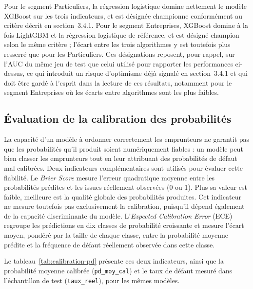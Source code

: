 Pour le segment Particuliers, la régression logistique domine nettement le modèle XGBoost sur les trois indicateurs, et est désignée championne conformément au critère décrit en section~3.4.1. Pour le segment Entreprises, XGBoost domine à la fois LightGBM et la régression logistique de référence, et est désigné champion selon le même critère ; l'écart entre les trois algorithmes y est toutefois plus resserré que pour les Particuliers. Ces désignations reposent, pour rappel, sur l'AUC du même jeu de test que celui utilisé pour rapporter les performances ci-dessus, ce qui introduit un risque d'optimisme déjà signalé en section~3.4.1 et qui doit être gardé à l'esprit dans la lecture de ces résultats, notamment pour le segment Entreprises où les écarts entre algorithmes sont les plus faibles.

\subsection{Évaluation de la calibration des probabilités}

La capacité d'un modèle à ordonner correctement les emprunteurs ne garantit pas que les probabilités qu'il produit soient numériquement fiables : un modèle peut bien classer les emprunteurs tout en leur attribuant des probabilités de défaut mal calibrées. Deux indicateurs complémentaires sont utilisés pour évaluer cette fiabilité. Le \emph{Brier Score} mesure l'erreur quadratique moyenne entre les probabilités prédites et les issues réellement observées (0 ou 1). Plus sa valeur est faible, meilleure est la qualité globale des probabilités produites. Cet indicateur ne mesure toutefois pas exclusivement la calibration, puisqu'il dépend également de la capacité discriminante du modèle. L'\emph{Expected Calibration Error} (ECE) regroupe les prédictions en dix classes de probabilité croissante et mesure l'écart moyen, pondéré par la taille de chaque classe, entre la probabilité moyenne prédite et la fréquence de défaut réellement observée dans cette classe.

Le tableau~\ref{tab:calibration-pd} présente ces deux indicateurs, ainsi que la probabilité moyenne calibrée (\texttt{pd\_moy\_cal}) et le taux de défaut mesuré dans l'échantillon de test (\texttt{taux\_reel}), pour les mêmes modèles.


